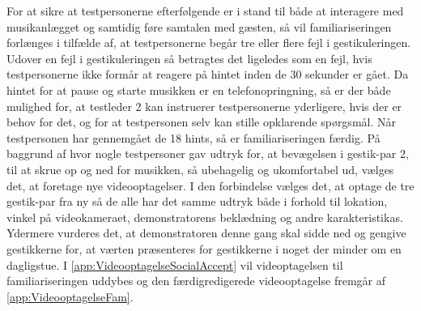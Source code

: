 For at sikre at testpersonerne efterfølgende er i stand til både at interagere med musikanlægget og samtidig føre samtalen med gæsten, så vil familiariseringen forlænges i tilfælde af, at testpersonerne begår tre eller flere fejl i gestikuleringen. Udover en fejl i gestikuleringen så betragtes det ligeledes som en fejl, hvis testpersonerne ikke formår at reagere på hintet inden de 30 sekunder er gået. Da hintet for at pause og starte musikken er en telefonopringning, så er der både mulighed for, at testleder 2 kan instruerer testpersonerne yderligere, hvis der er behov for det, og for at testpersonen selv kan stille opklarende spørgsmål. Når testpersonen har gennemgået de 18 hints, så er familiariseringen færdig.\blankline
%
På baggrund af  hvor nogle testpersoner gav udtryk for, at bevægelsen i gestik-par 2, til at skrue op og ned for musikken, så ubehagelig og ukomfortabel ud, vælges det, at foretage nye videooptagelser. I den forbindelse vælges det, at optage de tre gestik-par fra ny så de alle har det samme udtryk både i forhold til lokation, vinkel på videokameraet, demonstratorens beklædning og andre karakteristikas. Ydermere vurderes det, at demonstratoren denne gang skal sidde ned og gengive gestikkerne for, at værten præsenteres for gestikkerne i noget der minder om en dagligstue. I \autoref{app:VideooptagelseSocialAccept} vil videoptagelsen til familiariseringen uddybes og den færdigredigerede videooptagelse fremgår af \autoref{app:VideooptagelseFam}.

